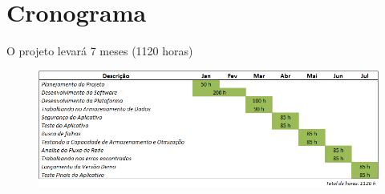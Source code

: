 \chapter[Cronograma]{Cronograma}



O projeto levará 7 meses (1120 horas)




\begin{figure}[htb]
	\begin{center}
	    \includegraphics[scale=0.8]{diagramaGanttCrono}
	\end{center}
\end{figure}








